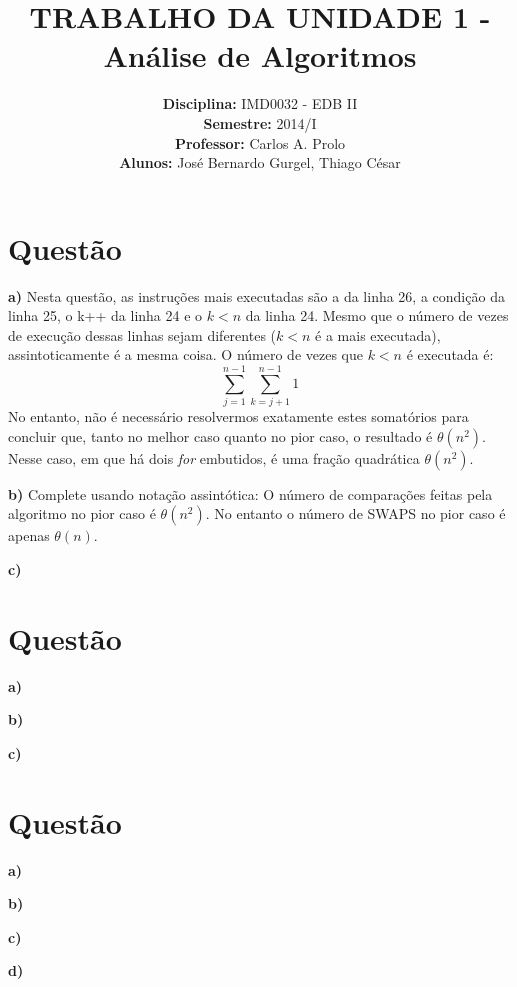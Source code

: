 \documentclass[a4paper,12pt]{article}
\title{TRABALHO DA UNIDADE 1 - Análise de Algoritmos}
\author{
\textbf{Disciplina:} IMD0032 - EDB II
\\\textbf{Semestre:} 2014/I
\\\textbf{Professor:} Carlos A. Prolo
\\\textbf{Alunos:} José Bernardo Gurgel, Thiago César
}
\date{} %
\begin{document}
\maketitle
\section{Questão}
\begin{description}
    \item{\textbf{a)}} Nesta questão, as instruções mais executadas são a da linha 26, a condição da linha 25, o k++ da linha 24 e o $k < n$ da linha 24. Mesmo que o número de vezes de execução dessas linhas sejam diferentes ($k < n$ é a mais executada), assintoticamente é a mesma coisa. O número de vezes que $k < n$ é executada é:
	$$
	\sum_{j=1}^{n-1} \sum_{k=j+1}^{n-1} 1
	$$
No entanto, não é necessário resolvermos exatamente estes somatórios para concluir que, tanto no melhor caso quanto no pior caso, o resultado é $\theta(n^2)$. Nesse caso, em que há dois \textit{for} embutidos, é uma fração quadrática $\theta(n^2)$.

	\item{\textbf{b)}} Complete usando notação assintótica: O número de comparações feitas pela algoritmo no pior caso é \underline{$\theta(n^2)$}. No entanto o número de SWAPS no pior caso é apenas \underline{$\theta(n)$}.
	\item{\textbf{c)}}
\end{description}

\section{Questão}
\begin{description}
    \item{\textbf{a)}}
	\item{\textbf{b)}}
	\item{\textbf{c)}}
\end{description}

\section{Questão}
\begin{description}
    \item{\textbf{a)}}
	\item{\textbf{b)}}
	\item{\textbf{c)}}
	\item{\textbf{d)}}
\end{description}
\end{document}
